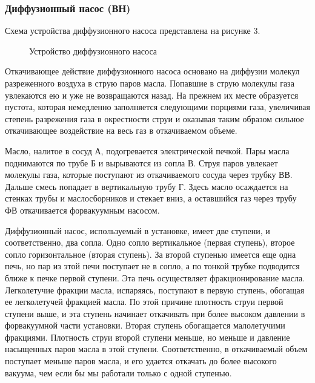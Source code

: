 \subsubsection{Диффузионный насос (ВН)}
Схема устройства диффузионного насоса представлена на рисунке 3.
\begin{figure}[ht]
    \label{figure3}
    \caption{Устройство диффузионного насоса}
\end{figure}

Откачивающее действие диффузионного насоса основано на диффузии молекул разреженного воздуха в струю паров масла. Попавшие в струю молекулы газа увлекаются ею и уже не возвращаются назад. На прежнем их месте образуется пустота, которая немедленно заполняется следующими порциями газа, увеличивая степень разрежения газа в окрестности струи и оказывая таким образом сильное откачивающее воздействие на весь газ в откачиваемом объеме.

Масло, налитое в сосуд А, подогревается электрической печкой. Пары масла поднимаются по трубе Б и вырываются из сопла В. Струя паров увлекает молекулы газа, которые поступают из откачиваемого сосуда через трубку ВВ. Дальше смесь попадает в вертикальную трубу Г. Здесь масло осаждается на стенках трубы и маслосборников и стекает вниз, а оставшийся газ через трубу ФВ откачивается форвакуумным насосом.

Диффузионный насос, используемый в установке, имеет две ступени, и соответственно, два сопла. Одно сопло вертикальное (первая ступень), второе сопло горизонтальное (вторая ступень). За второй ступенью имеется еще одна печь, но пар из этой печи поступает не в сопло, а по тонкой трубке подводится ближе к печке первой ступени. Эта печь осуществляет фракционирование
масла. Легколетучие фракции масла, испаряясь, поступают в первую ступень, обогащая ее легколетучей фракцией масла. По этой причине
плотность струи первой ступени выше, и эта ступень начинает откачивать при более высоком давлении в форвакуумной части установки. Вторая ступень обогащается малолетучими фракциями. Плотность струи второй ступени меньше, но меньше и давление насыщенных паров масла в этой ступени. Соответственно, в откачиваемый объем поступает меньше паров масла, и его удается откачать до более высокого вакуума, чем если бы мы работали только с одной ступенью.

